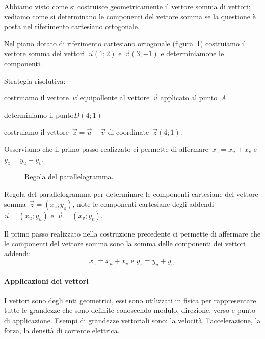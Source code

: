 Abbiamo visto come si costruisce geometricamente il vettore somma di vettori; 
vediamo come si determinano le componenti del vettore somma se la questione
è posta nel riferimento cartesiano ortogonale.

\begin{esempio}
Nel piano dotato di riferimento cartesiano ortogonale (figura~\ref{fig:F.10}) 
costruiamo il vettore somma dei vettori~\(\vec{u}(1;2)\) e~\(\vec{v}(3;-1)\) e 
determiniamone
le componenti.

Strategia risolutiva:
\begin{enumeratea}
\item costruiamo il vettore~\(\vec{w}\) equipollente al vettore~\(\vec{v}\) 
applicato al punto~\(A\)
\item determiniamo il punto\(D(4;1)\)
\item costruiamo il vettore~\(\vec{z}=\vec{u}+\vec{v}\) di 
coordinate~\(\vec{z}(4;1)\).
\end{enumeratea}
Osserviamo che il primo passo realizzato ci permette di 
affermare~\(x_z=x_u+x_v\) 
e~\(y_z=y_u+y_v\).
\end{esempio}


\begin{inaccessibleblock}
 \begin{figure}[t]
\centering

\caption{Regola del parallelogramma.}\label{fig:F.10}
\end{figure}
\end{inaccessibleblock}

\begin{procedura} Regola del parallelogramma per determinare le componenti 
cartesiane del vettore somma~\(\vec{z}=(x_z;y_z)\),
note le componenti cartesiane degli addendi~\(\vec{u}=(x_u;y_u)\) 
e~\(\vec{v}=(x_v;y_v)\).

Il primo passo realizzato nella costruzione precedente ci permette di 
affermare 
che le componenti del vettore somma sono la somma
delle componenti dei vettori addendi:\[x_z=x_u+x_v\text{ e }y_z=y_u+y_v.\]
\end{procedura}


\paragraph{Applicazioni dei vettori}
I vettori sono degli enti geometrici, essi sono utilizzati in fisica per 
rappresentare tutte le grandezze che sono definite conoscendo modulo, 
direzione,
verso e punto di applicazione. Esempi di grandezze vettoriali sono: la 
velocità, l'accelerazione, la forza, la densità di corrente elettrica.

